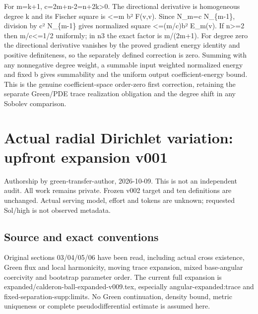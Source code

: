 \documentclass[11pt]{article}
\theoremstyle{definition}
\theoremstyle{remark}
\numberwithin{equation}{section}
\begin{document}
For m=k+1, c=2m+n-2=n+2k\textgreater0. The directional derivative is
homogeneous degree k and its Fischer square is \textless=m
\textbar b\textbar² F(v,v). Since N\_m=c N\_\{m-1\}, division by c²
N\_\{m-1\} gives normalized square \textless=(m/c)\textbar b\textbar²
E\_m(v). If n\textgreater=2 then m/c\textless=1/2 uniformly; in n3 the
exact factor is m/(2m+1). For degree zero the directional derivative
vanishes by the proved gradient energy identity and positive
definiteness, so the separately defined correction is zero. Summing with
any nonnegative degree weight, a summable input weighted normalized
energy and fixed b gives summability and the uniform output
coefficient-energy bound. This is the genuine coefficient-space
order-zero first correction, retaining the separate Green/PDE trace
realization obligation and the degree shift in any Sobolev comparison.

\clearpage
\hypertarget{source-bf1ada3d0e91-actual-radial-dirichlet-variation-upfront-expansion-v001}{%
\section{Actual radial Dirichlet variation: upfront expansion
v001}\label{source-bf1ada3d0e91-actual-radial-dirichlet-variation-upfront-expansion-v001}}

Authorship by green-transfer-author, 2026-10-09. This is not an
independent audit. All work remains private. Frozen v002 target and ten
definitions are unchanged. Actual serving model, effort and tokens are
unknown; requested Sol/high is not observed metadata.

\hypertarget{source-bf1ada3d0e91-source-and-exact-conventions}{%
\subsection{Source and exact
conventions}\label{source-bf1ada3d0e91-source-and-exact-conventions}}

Original sections 03/04/05/06 have been read, including actual cross
existence, Green flux and local harmonicity, moving trace expansion,
mixed base-angular coercivity and bootstrap parameter order. The current
full expansion is expanded/calderon-ball-expanded-v009.tex, especially
angular-expanded:trace and fixed-separation-supp:limits. No Green
continuation, density bound, metric uniqueness or complete
pseudodifferential estimate is assumed here.
\end{document}

